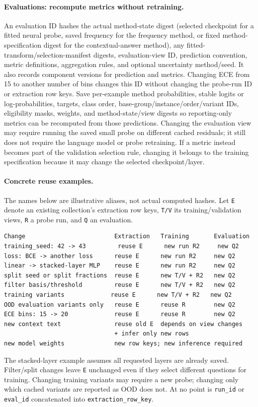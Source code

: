 \documentclass[11pt]{article}
\begin{document}
\paragraph{Evaluations: recompute metrics without retraining.}
An evaluation ID hashes the actual method-state digest (selected checkpoint for a fitted neural probe, saved frequency for the frequency method, or fixed method-specification digest for the contextual-answer method), any fitted-transform/selection-manifest digests, evaluation-view ID, prediction convention, metric definitions, aggregation rules, and optional uncertainty method/seed.
It also records component versions for prediction and metrics.
Changing ECE from 15 to another number of bins changes this ID without changing the probe-run ID or extraction row keys.
Save per-example method probabilities, stable logits or log-probabilities, targets, class order, base-group/instance/order/variant IDs, eligibility masks, weights, and method-state/view digests so reporting-only metrics can be recomputed from those predictions.
Changing the evaluation view may require running the saved small probe on different cached residuals; it still does not require the language model or probe retraining.
If a metric instead becomes part of the validation selection rule, changing it belongs to the training specification because it may change the selected checkpoint/layer.

\paragraph{Concrete reuse examples.}
The names below are illustrative aliases, not actual computed hashes.
Let \texttt{E} denote an existing collection's extraction row keys, \texttt{T/V} its training/validation views, \texttt{R} a probe run, and \texttt{Q} an evaluation.
\begin{verbatim}
Change                         Extraction   Training       Evaluation
training_seed: 42 -> 43         reuse E      new run R2     new Q2
loss: BCE -> another loss      reuse E      new run R2     new Q2
linear -> stacked-layer MLP    reuse E      new run R2     new Q2
split seed or split fractions  reuse E      new T/V + R2   new Q2
filter basis/threshold         reuse E      new T/V + R2   new Q2
training variants             reuse E      new T/V + R2   new Q2
OOD evaluation variants only   reuse E      reuse R        new Q2
ECE bins: 15 -> 20             reuse E      reuse R        new Q2
new context text               reuse old E  depends on view changes
                               + infer only new rows
new model weights              new row keys; new inference required
\end{verbatim}
The stacked-layer example assumes all requested layers are already saved.
Filter/split changes leave \texttt{E} unchanged even if they select different questions for training.
Changing training variants may require a new probe; changing only which cached variants are reported as OOD does not.
At no point is \texttt{run\_id} or \texttt{eval\_id} concatenated into \texttt{extraction\_row\_key}.
\end{document}

